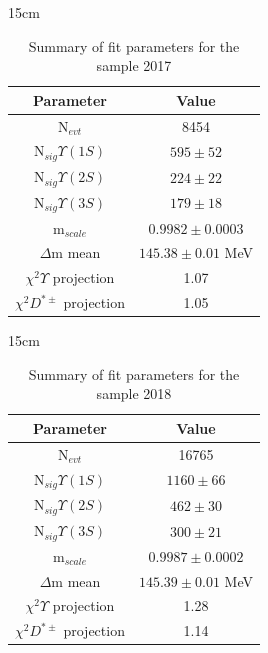 \begin{table}[!htbp]{15cm}
  \caption{Summary of fit parameters for the sample 2017}\label{tab:fit_summary_2017}
  \begin{tabular}{ c | c }
    Parameter & Value \\ 
    \hline
    N$_{evt}$                    & 8454 \\ \hline
    N$_{sig} \Upsilon(1S)$       & $595 \pm 52$ \\ \hline
    N$_{sig} \Upsilon(2S)$       & $224 \pm 22$ \\ \hline
    N$_{sig} \Upsilon(3S)$       & $179 \pm 18$ \\ \hline
    m$_{scale}$                  & $0.9982 \pm 0.0003$ \\ \hline
    $\Delta$m mean               & $145.38 \pm 0.01$ MeV \\ \hline
    $\chi^2 \Upsilon$ projection & 1.07 \\ \hline
    $\chi^2 D^{*\pm}$ projection & 1.05 \\ \hline
  \end{tabular}
\end{table}

\begin{table}[!htbp]{15cm}
  \caption{Summary of fit parameters for the sample 2018}\label{tab:fit_summary_2018}
  \begin{tabular}{ c | c }
    Parameter & Value \\ 
    \hline 
    N$_{evt}$                    & 16765 \\ \hline
    N$_{sig} \Upsilon(1S)$       & $1160 \pm 66$ \\ \hline
    N$_{sig} \Upsilon(2S)$       & $462 \pm 30$ \\ \hline
    N$_{sig} \Upsilon(3S)$       & $300 \pm 21$ \\ \hline
    m$_{scale}$                  & $0.9987 \pm 0.0002$ \\ \hline
    $\Delta$m mean               & $145.39 \pm 0.01$ MeV \\ \hline
    $\chi^2 \Upsilon$ projection & 1.28 \\ \hline
    $\chi^2 D^{*\pm}$ projection & 1.14 \\ \hline
  \end{tabular}
\end{table}

